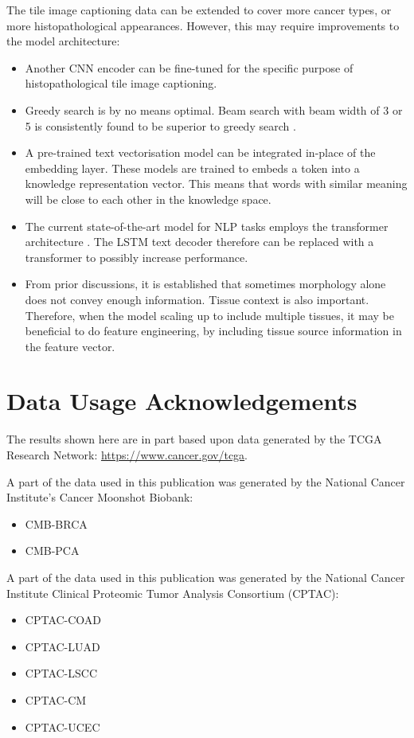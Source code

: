 \documentclass{l4proj}
\begin{document}
The tile image captioning data can be extended to cover more cancer types, or more histopathological appearances. However, this may require improvements to the model architecture:
\begin{itemize}
    \item Another CNN encoder can be fine-tuned for the specific purpose of histopathological tile image captioning.
    \item Greedy search is by no means optimal. Beam search with beam width of 3 or 5 is consistently found to be superior to greedy search \citep{cohen2019, kumar2022}.
    \item A pre-trained text vectorisation model can be integrated in-place of the embedding layer. These models are trained to embeds a token into a knowledge representation vector. This means that words with similar meaning will be close to each other in the knowledge space.
    \item The current state-of-the-art model for NLP tasks employs the transformer architecture \citep{vaswani2023}. The LSTM text decoder therefore can be replaced with a transformer to possibly increase performance.
    \item From prior discussions, it is established that sometimes morphology alone does not convey enough information. Tissue context is also important. Therefore, when the model scaling up to include multiple tissues, it may be beneficial to do feature engineering, by including tissue source information in the feature vector.
\end{itemize}

\section{Data Usage Acknowledgements}

The results shown here are in part based upon data generated by the TCGA Research Network: \url{https://www.cancer.gov/tcga}.

A part of the data used in this publication was generated by the National Cancer Institute’s Cancer Moonshot Biobank:
\begin{itemize}
    \item CMB-BRCA \citep{cmb-brca}
    \item CMB-PCA \citep{cmb-pca}
\end{itemize}

A part of the data used in this publication was generated by the National Cancer Institute Clinical Proteomic Tumor Analysis Consortium (CPTAC):
\begin{itemize}
    \item CPTAC-COAD \citep{cptac-coad}
    \item CPTAC-LUAD \citep{cptac-luad}
    \item CPTAC-LSCC \citep{cptac-lscc}
    \item CPTAC-CM \citep{cptac-cm}
    \item CPTAC-UCEC \citep{cptac-ucec}
\end{itemize}
\end{document}
